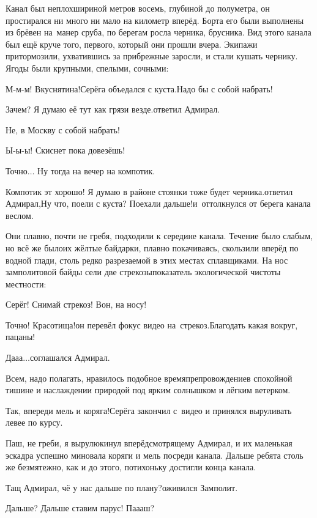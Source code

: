 Канал был неплох\mdash шириной метров восемь, глубиной до полуметра, он простирался ни много ни мало на километр вперёд. Борта его были выполнены из брёвен на~манер сруба, по берегам росла черника, брусника. Вид этого канала был ещё круче того, первого, который они прошли вчера. Экипажи притормозили, ухватившись за прибрежные заросли, и стали кушать чернику. Ягоды были крупными, спелыми, сочными:

\diagdash М-м-м! Вкуснятина!\mdash Серёга объедался с куста.\mdash Надо бы с собой набрать!

\diagdash Зачем? Я думаю её тут как грязи везде.\mdash ответил Адмирал.

\diagdash Не, в Москву с собой набрать!

\diagdash Ы-ы-ы! Скиснет пока довезёшь!

\diagdash Точно$\ldots$ Ну тогда на вечер на компотик.

\diagdash Компотик эт хорошо! Я думаю в районе стоянки тоже будет черника.\mdash ответил Адмирал,\mdash Ну что, поели с куста? Поехали дальше!\mdash и~оттолкнулся от берега канала веслом.

Они плавно, почти не гребя, подходили к середине канала. Течение было слабым, но всё же было\mdash их жёлтые байдарки, плавно покачиваясь, скользили вперёд по водной глади, столь редко разрезаемой в этих местах сплавщиками. На нос замполитовой байды сели две стрекозы\mdash показатель экологической чистоты местности:

\diagdash Серёг! Снимай стрекоз! Вон, на носу!

\diagdash Точно! Красотища!\mdash он перевёл фокус видео на~стрекоз.\mdash Благодать какая вокруг, пацаны!

\diagdash Да\sdash а\sdash а$\ldots$\mdash соглашался Адмирал.

Всем, надо полагать, нравилось подобное времяпрепровождение\mdash в спокойной тишине и наслаждении природой под ярким солнышком и лёгким ветерком. 

\diagdash Так, впереди мель и коряга!\mdash Серёга закончил с~видео и принялся выруливать левее по курсу. 

\diagdash Паш, не греби, я вырулю\mdash кинул вперёдсмотрящему Адмирал, и их маленькая эскадра успешно миновала коряги и мель посреди канала. Дальше ребята столь же безмятежно, как и до этого, потихоньку достигли конца канала.

\diagdash Тащ Адмирал, чё у нас дальше по плану?\mdash оживился Замполит.

\diagdash Дальше? Дальше ставим парус! П\sdash а\sdash а\sdash аш?

